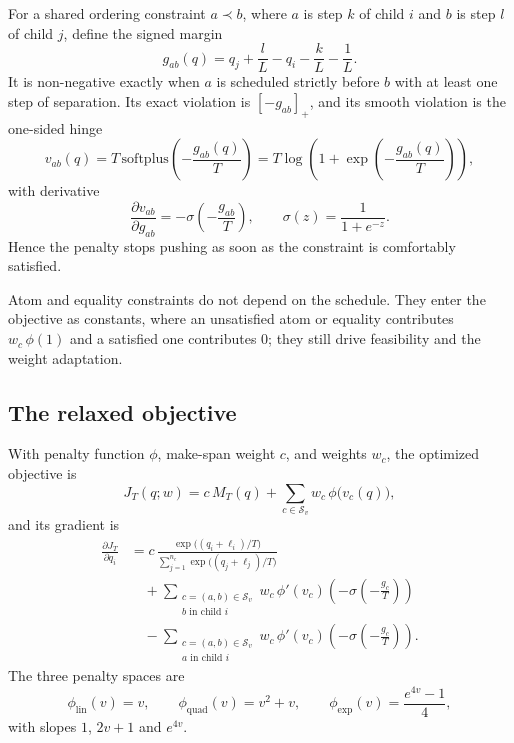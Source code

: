 \documentclass[11pt,a4paper]{article}
\newcommand{\cS}{\mathcal{S}}
\begin{document}
For a shared ordering constraint $a\prec b$, where $a$ is step $k$ of child
$i$ and $b$ is step $l$ of child $j$, define the signed margin
\begin{equation}
g_{ab}(q)=q_j+\frac{l}{L}-q_i-\frac{k}{L}-\frac{1}{L}.
\label{eq:margin}
\end{equation}
It is non-negative exactly when $a$ is scheduled strictly before $b$ with at
least one step of separation. Its exact violation is $[-g_{ab}]_+$, and its
smooth violation is the one-sided hinge
\begin{equation}
v_{ab}(q)=T\,\mathrm{softplus}\!\left(-\frac{g_{ab}(q)}{T}\right)
=T\log\!\left(1+\exp\!\left(-\frac{g_{ab}(q)}{T}\right)\right),
\label{eq:hinge}
\end{equation}
with derivative
\begin{equation}
\frac{\partial v_{ab}}{\partial g_{ab}}
=-\sigma\!\left(-\frac{g_{ab}}{T}\right),
\qquad
\sigma(z)=\frac{1}{1+e^{-z}}.
\end{equation}
Hence the penalty stops pushing as soon as the constraint is comfortably
satisfied.

Atom and equality constraints do not depend on the schedule. They enter the
objective as constants, where an unsatisfied atom or equality contributes
$w_c\,\phi(1)$ and a satisfied one contributes $0$; they still drive
feasibility and the weight adaptation.

\subsection{The relaxed objective}
With penalty function $\phi$, make-span weight $c$, and weights $w_c$, the
optimized objective is
\begin{equation}
J_T(q;w)=c\,M_T(q)+\sum_{c\in\cS_v}w_c\,\phi\bigl(v_c(q)\bigr),
\label{eq:J}
\end{equation}
and its gradient is
\begin{equation}
\begin{aligned}
\frac{\partial J_T}{\partial q_i}
&=
c\,\frac{\exp\bigl((q_i+\ell_i)/T\bigr)}
{\sum_{j=1}^{n_c}\exp\bigl((q_j+\ell_j)/T\bigr)}\\
&\quad+
\sum_{\substack{c=(a,b)\in\cS_v\\ b\text{ in child }i}}
w_c\,\phi'(v_c)\left(-\sigma\!\left(-\frac{g_c}{T}\right)\right)\\
&\quad-
\sum_{\substack{c=(a,b)\in\cS_v\\ a\text{ in child }i}}
w_c\,\phi'(v_c)\left(-\sigma\!\left(-\frac{g_c}{T}\right)\right).
\end{aligned}
\label{eq:gradient}
\end{equation}
The three penalty spaces are
\begin{equation}
\phi_{\mathrm{lin}}(v)=v,
\qquad
\phi_{\mathrm{quad}}(v)=v^2+v,
\qquad
\phi_{\mathrm{exp}}(v)=\frac{e^{4v}-1}{4},
\end{equation}
with slopes $1$, $2v+1$ and $e^{4v}$.
\end{document}
